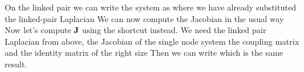 \solution 
On the linked pair we can write the system as 
where we have already substituted the linked-pair Laplacian 
We can now compute the Jacobian in the usual way 
Now let's compute $\bf J$ using the shortcut instead. We need the linked pair Laplacian from above, the Jacobian of the single node system 
the coupling matrix 
and the identity matrix of the right size
Then we can write 
which is the same result.





